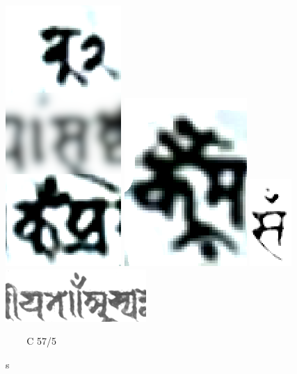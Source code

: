 \begin{figure}
\hspace{3em} 
\includegraphics[scale=.2]{images/mspaperA227rkakapadablurred.png}
\hfill
\includegraphics[scale=.2]{images/doublekakapada_msPaperA238r.png	}
\hfill
\includegraphics[scale=.4]{images/C57_5_kakapada7v.png}
\hfill
\includegraphics[scale=.5]{images/dottedkakapada01.png}
\hspace{3em}

\hspace{2em}
\msPaperA\ \recto
\hspace{1.5em}
\msPaperA\ \recto\
\hspace{.7em}
C 57/5 \verso\
\hspace{2.4em}
\msNa\ \verso
\hspace{2em}
\caption{s\label{fig:kakapadas}}
\end{figure}

